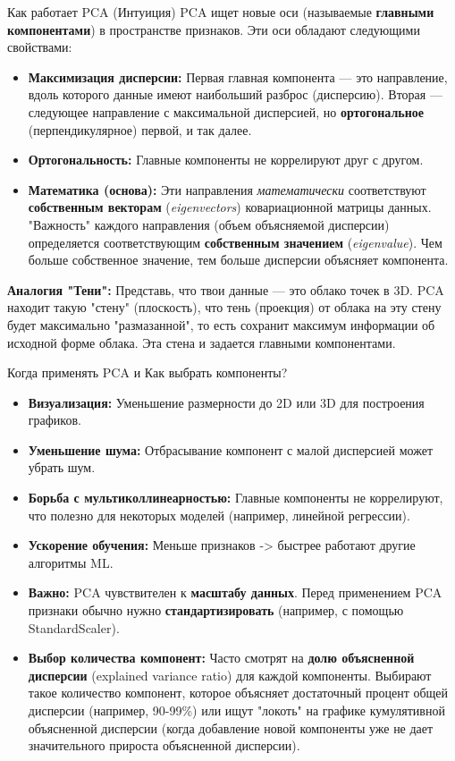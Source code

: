 \begin{textbox}{Как работает PCA (Интуиция)}
    PCA ищет новые оси (называемые \textbf{главными компонентами}) в пространстве признаков. Эти оси обладают следующими свойствами:
    \begin{itemize}
        \item \textbf{Максимизация дисперсии:} Первая главная компонента — это направление, вдоль которого данные имеют наибольший разброс (дисперсию). Вторая — следующее направление с максимальной дисперсией, но \textbf{ортогональное} (перпендикулярное) первой, и так далее.
        \item \textbf{Ортогональность:} Главные компоненты не коррелируют друг с другом.
        \item \textbf{Математика (основа):} Эти направления \textit{математически} соответствуют \textbf{собственным векторам} (\textit{eigenvectors}) ковариационной матрицы данных. "Важность" каждого направления (объем объясняемой дисперсии) определяется соответствующим \textbf{собственным значением} (\textit{eigenvalue}). Чем больше собственное значение, тем больше дисперсии объясняет компонента.
    \end{itemize}
    \textbf{Аналогия "Тени":} Представь, что твои данные — это облако точек в 3D. PCA находит такую "стену" (плоскость), что тень (проекция) от облака на эту стену будет максимально "размазанной", то есть сохранит максимум информации об исходной форме облака. Эта стена и задается главными компонентами.
\end{textbox}

\begin{alerttextbox}{Когда применять PCA и Как выбрать компоненты?}
    \begin{itemize}
        \item \textbf{Визуализация:} Уменьшение размерности до 2D или 3D для построения графиков.
        \item \textbf{Уменьшение шума:} Отбрасывание компонент с малой дисперсией может убрать шум.
        \item \textbf{Борьба с мультиколлинеарностью:} Главные компоненты не коррелируют, что полезно для некоторых моделей (например, линейной регрессии).
        \item \textbf{Ускорение обучения:} Меньше признаков -> быстрее работают другие алгоритмы ML.
        \item \textbf{Важно:} PCA чувствителен к \textbf{масштабу данных}. Перед применением PCA признаки обычно нужно \textbf{стандартизировать} (например, с помощью StandardScaler).
        \item \textbf{Выбор количества компонент:} Часто смотрят на \textbf{долю объясненной дисперсии} (explained variance ratio) для каждой компоненты. Выбирают такое количество компонент, которое объясняет достаточный процент общей дисперсии (например, 90-99\%) или ищут "локоть" на графике кумулятивной объясненной дисперсии (когда добавление новой компоненты уже не дает значительного прироста объясненной дисперсии).
    \end{itemize}
\end{alerttextbox}

